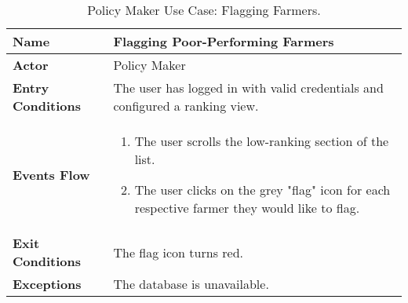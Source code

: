 
\begin{table}[H]
\centering
\small
\caption{\label{tab:policyUseFlag}Policy Maker Use Case: Flagging Farmers.}
\renewcommand{\arraystretch}{1.25}
\begin{tabular}{|l|>{\raggedright\arraybackslash}m{12cm}|}
    \hline
    \textbf{Name} & Flagging Poor-Performing Farmers\\
    \hline
   	\textbf{Actor} & Policy Maker\\
    \hline
    \textbf{Entry Conditions} & The user has logged in with valid credentials and configured a ranking view.\\
    \hline
    \textbf{Events Flow} & 
    \begin{enumerate}
    	\item The user scrolls the low-ranking section of the list.
    	\item The user clicks on the grey "flag" icon for each respective farmer they would like to flag. 
    \end{enumerate}\\
    \hline
    \textbf{Exit Conditions} & The flag icon turns red.\\
    \hline
    \textbf{Exceptions} & The database is unavailable.\\
    \hline
\end{tabular}
\end{table}